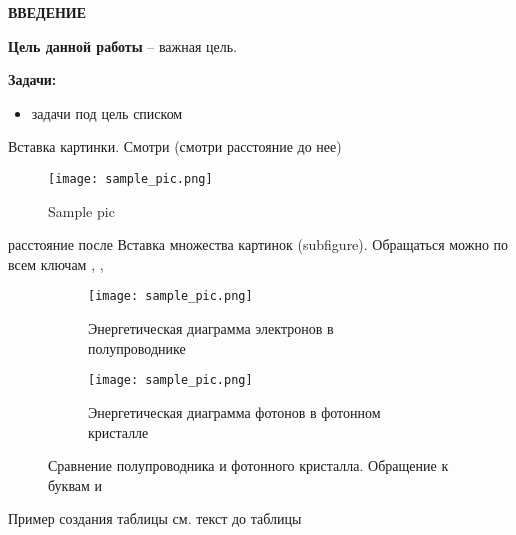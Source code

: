 \documentclass[../template.tex]{subfiles}
\begin{document}
	\begin{center}
		\normalsize\bfseries\MakeUppercase{ВВЕДЕНИЕ}
	\end{center}

	
\textbf{Цель данной работы} -- важная цель.

\textbf{Задачи:}
\begin{itemize}
	\item задачи под цель списком
\end{itemize}
	
\cite{kuchyanovLazernayaGeneraciyaOpalopodobnyh2016} %

Вставка картинки. Смотри  (смотри расстояние до нее)

\begin{figure}[h]
	\centering
	\texttt{[image: sample\_pic.png]}
	\caption{Sample pic}
	\label{fig:sample_pic}
\end{figure}
расстояние после
Вставка множества картинок (subfigure). Обращаться можно по всем ключам , , 

\begin{figure}[h]
	\centering
	\begin{subfigure}[t]{.48\textwidth}
		\centering
		\texttt{[image: sample\_pic.png]}  
		\caption{Энергетическая диаграмма электронов в полупроводнике}
		\label{fig:subfig_a}
	\end{subfigure}
	\hfill
	\begin{subfigure}[t]{.48\textwidth}
		\centering
		\texttt{[image: sample\_pic.png]} 
		\caption{Энергетическая диаграмма фотонов в фотонном кристалле}
		\label{fig:subfig_b}
	\end{subfigure}
	\caption{Сравнение полупроводника и фотонного кристалла. Обращение к буквам  и }
	\label{fig:fig_of_subfig}
\end{figure}	
	
	Пример создания таблицы см. 
	текст до таблицы %
	
\end{document}
